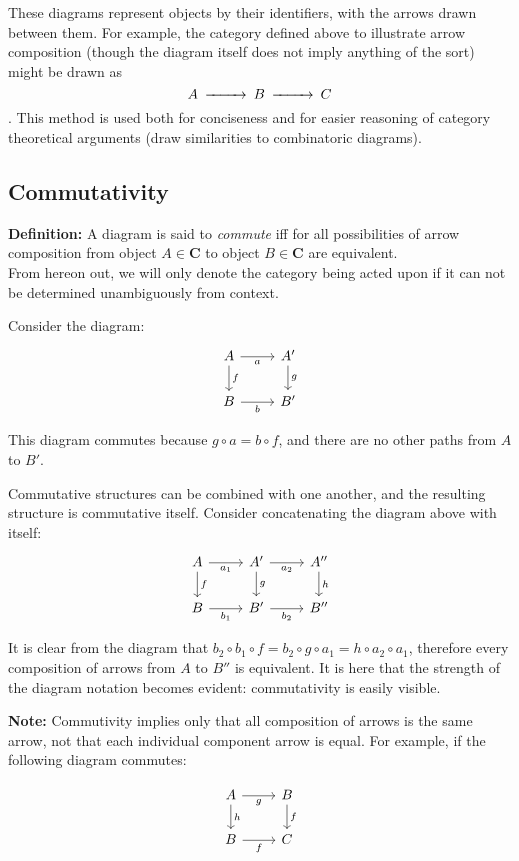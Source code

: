 \documentclass[]{article}
\newcommand{\what}{}
\newcommand{\cat}[1]{\mathbf{#1}}
\newcommand{\defn}[2]{
\renewcommand{\what}{\textit{#1} }
\textbf{Definition:} #2\\
}
\newcommand{\diag}[1]{$$\begin{CD}#1\end{CD}$$}
\newcommand{\cdr}[1]{\arrow[swap]{r}{#1}}
\newcommand{\cdd}[1]{\arrow{d}{#1}}
\begin{document}
These diagrams represent objects by their identifiers, with the arrows drawn between them. For example, the category
defined above to illustrate arrow composition (though the diagram itself does not imply anything of the sort) might be
drawn as \diag{ A @>>> B @>>> C }. This method is used both for conciseness and for easier reasoning of category
theoretical arguments (draw similarities to combinatoric diagrams).

\subsection{Commutativity}

\defn{commutativity}{A diagram is said to \textit{commute} iff for all possibilities of arrow composition from object $A
\in \cat{C}$ to object $B \in \cat{C}$ are equivalent.}

From hereon out, we will only denote the category being acted upon if it can not be determined unambiguously from
context.

Consider the diagram:
$$\begin{tikzcd}
A \cdr{a} \cdd{f} & A' \cdd{g} \\
B \cdr{b} & B'
\end{tikzcd}$$

This diagram commutes because $g\circ a = b\circ f$, and there are no other paths from $A$ to $B'$.

Commutative structures can be combined with one another, and the resulting structure is commutative itself. Consider
concatenating the diagram above with itself:
$$\begin{tikzcd}
A \cdr{a_1} \cdd{f} & A' \cdr{a_2} \cdd{g} & A'' \cdd{h} \\
B \cdr{b_1} & B' \cdr{b_2} & B''
\end{tikzcd}$$

It is clear from the diagram that $b_2\circ b_1\circ f = b_2\circ g\circ a_1 = h\circ a_2 \circ a_1$, therefore every
composition of arrows from $A$ to $B''$ is equivalent. It is here that the strength of the diagram notation becomes
evident: commutativity is easily visible.

\textbf{Note:} Commutivity implies only that all composition of arrows is the same arrow, not that each individual
component arrow is equal. For example, if the following diagram commutes:

$$\begin{tikzcd}
A \cdr{g} \cdd{h} & B \cdd{f} \\
B \cdr{f} & C
\end{tikzcd}$$
\end{document}
